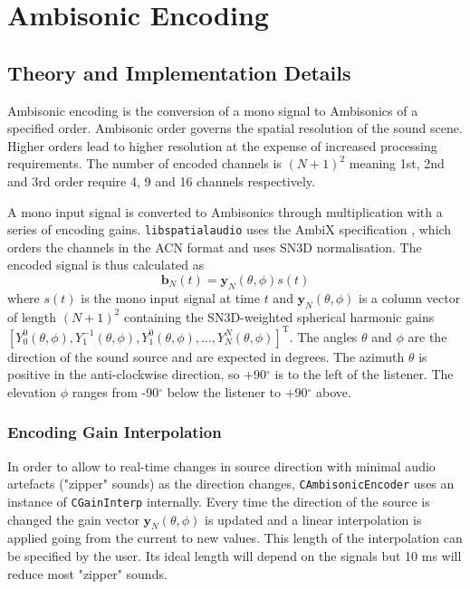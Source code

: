 \documentclass[12pt]{report}
\def\libspataud{\texttt{libspatialaudio}\xspace}
\def\deg{$^{\circ}$ }
\newcommand{\code}[1]{\texttt{#1}}
\begin{document}
\section{Ambisonic Encoding}\label{AmbiEncoding}

\subsection{Theory and Implementation Details}
Ambisonic encoding is the conversion of a mono signal to Ambisonics of a specified order.
Ambisonic order governs the spatial resolution of the sound scene.
Higher orders lead to higher resolution at the expense of increased processing requirements.
The number of encoded channels is $(N + 1)^{2}$ meaning 1st, 2nd and 3rd order require 4, 9 and 16 channels respectively.

A mono input signal is converted to Ambisonics through multiplication with a series of encoding gains.
\libspataud uses the AmbiX specification \cite{nachbar_ambix_2011}, which orders the channels in the ACN format and uses SN3D normalisation.
The encoded signal is thus calculated as
\begin{equation}
    \textbf{b}_{N}(t) = \textbf{y}_{N}(\theta,\phi)s(t)
\end{equation}
\sloppy where $s(t)$ is the mono input signal at time $t$ and $\textbf{y}_{N}(\theta,\phi)$ is a column vector of length $(N + 1)^{2}$ containing the SN3D-weighted spherical harmonic gains $[Y_{0}^{0}(\theta, \phi), Y_{1}^{-1}(\theta, \phi), Y_{1}^{0}(\theta, \phi),\ldots,Y_{N}^{N}(\theta, \phi)]^{\mathrm{T}}$. The angles $\theta$ and $\phi$ are the direction of the sound source and are expected in degrees. The azimuth $\theta$ is positive in the anti-clockwise direction, so +90\deg is to the left of the listener. The elevation $\phi$ ranges from -90\deg below the listener to +90\deg above.

\subsubsection{Encoding Gain Interpolation}

In order to allow to real-time changes in source direction with minimal audio artefacts ("zipper" sounds) as the direction changes, \code{CAmbisonicEncoder} uses an instance of \code{CGainInterp} internally.
Every time the direction of the source is changed the gain vector $\textbf{y}_{N}(\theta,\phi)$ is updated and a linear interpolation is applied going from the current to new values.
This length of the interpolation can be specified by the user.
Its ideal length will depend on the signals but 10 ms will reduce most "zipper" sounds.
\end{document}
